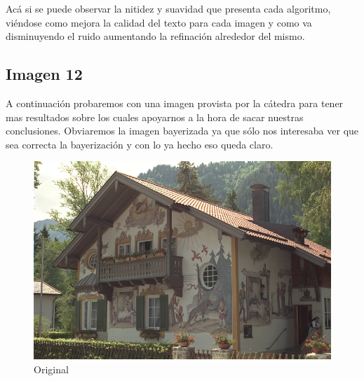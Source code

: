 {Acá si se puede observar la nitidez y suavidad que presenta cada algoritmo, viéndose como mejora la calidad del texto para cada imagen y como va disminuyendo el ruido aumentando la refinación alrededor del mismo.

\newpage

\subsection{Imagen 12}

A continuación probaremos con una imagen provista por la cátedra para tener mas resultados sobre los cuales apoyarnos a la hora de sacar nuestras conclusiones. Obviaremos la imagen bayerizada ya que sólo
nos interesaba ver que sea correcta la bayerización y con lo ya hecho eso queda claro.

\begin{figure}[h]
\begin{center}
       \includegraphics[scale=0.3]{imagenes/img12.png}
       \caption{Original }\label{fig:awesome_image1}
        \end{center}

\end{figure}

}
